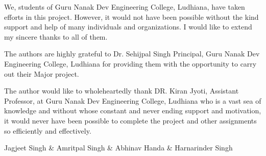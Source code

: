 \begin{Large}
\end{Large}

We, students of Guru Nanak Dev Engineering College, Ludhiana, have taken efforts in this project.
However, it would not have been possible without the kind support and help of many individuals
and organizations. I would like to extend my sincere thanks to all of them.

The authors are highly grateful to Dr. Sehijpal Singh Principal, Guru Nanak Dev Engineering College, Ludhiana for providing them with the opportunity to carry out their Major project.

The author would like to wholeheartedly thank DR. Kiran Jyoti, Assistant Professor, at Guru Nanak Dev Engineering College, Ludhiana who is a vast sea of knowledge and
without whose constant and never ending support and motivation, it would never have been
possible to complete the project and other assignments so efficiently and effectively.


\vskip 1.0cm 
\noindent Jagjeet Singh \& Amritpal Singh \& Abhinav Handa \& Harnarinder Singh 
